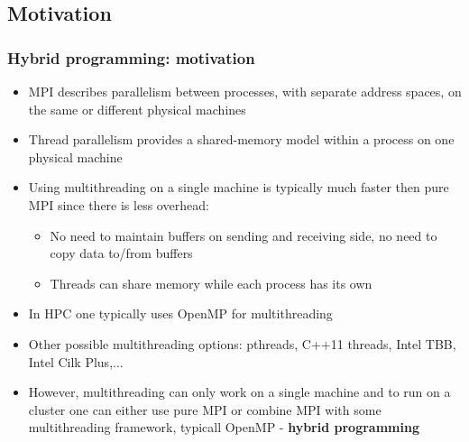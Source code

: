 \documentclass{beamer}
\begin{document}
\subsection{Motivation}
\begin{frame}[fragile]
  \frametitle{Hybrid programming: motivation}
  \begin{itemize}
  \item MPI describes parallelism between processes, with separate address spaces, on the same or different physical machines
  \item Thread parallelism provides a shared-memory model within a process on one physical machine
  \item Using multithreading on a single machine is typically much faster then pure MPI since there is less overhead:
    \begin{itemize}
    \item No need to maintain buffers on sending and receiving side, no need to copy data to/from buffers
    \item Threads can share memory while each process has its own
    \end{itemize}
  \item In HPC one typically uses OpenMP for multithreading
  \item Other possible multithreading options: pthreads, C++11 threads, Intel TBB, Intel Cilk Plus,...
  \item However, multithreading can only work on a single machine and to run on a cluster one can either use pure MPI or combine MPI with some multithreading framework, typicall OpenMP - {\color{mycolordef}\textbf{hybrid programming}}
  \end{itemize}
\end{frame}
\end{document}
